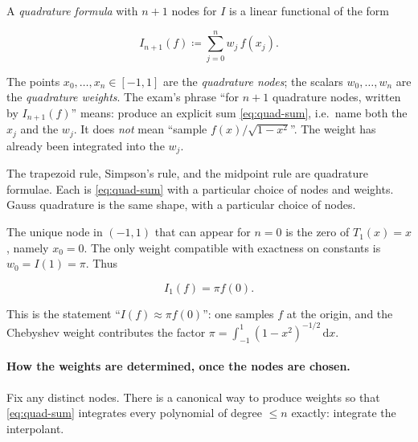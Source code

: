\begin{definition}
\label{def:quadrature}
A \emph{quadrature formula} with \(n+1\) nodes for \(I\) is a linear functional of the form

\begin{equation}
\label{eq:quad-sum}
I_{n+1}(f)
\coloneqq
\sum_{j=0}^{n} w_{j}\, f(x_{j}).
\end{equation}

The points \(x_{0},\ldots,x_{n}\in[-1,1]\) are the \emph{quadrature nodes}; the scalars \(w_{0},\ldots,w_{n}\) are the \emph{quadrature weights}. The exam's phrase ``for \(n+1\) quadrature nodes, written by \(I_{n+1}(f)\)'' means: produce an explicit sum \eqref{eq:quad-sum}, i.e.\ name both the \(x_{j}\) and the \(w_{j}\). It does \emph{not} mean ``sample \(f(x)/\sqrt{1-x^{2}}\)''. The weight has already been integrated into the \(w_{j}\).
\end{definition}

The trapezoid rule, Simpson's rule, and the midpoint rule are quadrature formulae. Each is \eqref{eq:quad-sum} with a particular choice of nodes and weights. Gauss quadrature is the same shape, with a particular choice of nodes.

\begin{example}
\label{ex:gauss-cheb-one}
The unique node in \((-1,1)\) that can appear for \(n=0\) is the zero of \(T_{1}(x)=x\), namely \(x_{0}=0\). The only weight compatible with exactness on constants is \(w_{0}=I(1)=\pi\). Thus

\[
I_{1}(f)
=
\pi f(0).
\]

This is the statement ``\(I(f)\approx \pi f(0)\)'': one samples \(f\) at the origin, and the Chebyshev weight contributes the factor \(\pi=\int_{-1}^{1}(1-x^{2})^{-1/2}\,\mathrm{d}x\).
\end{example}

\paragraph{How the weights are determined, once the nodes are chosen.}

Fix any distinct nodes. There is a canonical way to produce weights so that \eqref{eq:quad-sum} integrates every polynomial of degree \(\le n\) exactly: integrate the interpolant.

